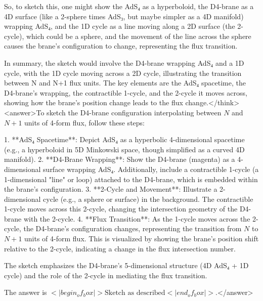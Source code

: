 So, to sketch this, one might show the AdS₄ as a hyperboloid, the D4-brane as a 4D surface (like a 2-sphere times AdS₃, but maybe simpler as a 4D manifold) wrapping AdS₄, and the 1D cycle as a line moving along a 2D surface (the 2-cycle), which could be a sphere, and the movement of the line across the sphere causes the brane's configuration to change, representing the flux transition.

In summary, the sketch would involve the D4-brane wrapping AdS₄ and a 1D cycle, with the 1D cycle moving across a 2D cycle, illustrating the transition between N and N+1 flux units. The key elements are the AdS₄ spacetime, the D4-brane's wrapping, the contractible 1-cycle, and the 2-cycle it moves across, showing how the brane's position change leads to the flux change.</think><answer>To sketch the D4-brane configuration interpolating between \( N \) and \( N+1 \) units of 4-form flux, follow these steps:  

1. **AdS₄ Spacetime**: Depict AdS₄ as a hyperbolic 4-dimensional spacetime (e.g., a hyperboloid in 5D Minkowski space, though simplified as a curved 4D manifold).  
2. **D4-Brane Wrapping**: Show the D4-brane (magenta) as a 4-dimensional surface wrapping AdS₄. Additionally, include a contractible 1-cycle (a 1-dimensional "line" or loop) attached to the D4-brane, which is embedded within the brane’s configuration.  
3. **2-Cycle and Movement**: Illustrate a 2-dimensional cycle (e.g., a sphere or surface) in the background. The contractible 1-cycle moves across this 2-cycle, changing the intersection geometry of the D4-brane with the 2-cycle.  
4. **Flux Transition**: As the 1-cycle moves across the 2-cycle, the D4-brane’s configuration changes, representing the transition from \( N \) to \( N+1 \) units of 4-form flux. This is visualized by showing the brane’s position shift relative to the 2-cycle, indicating a change in the flux intersection number.  

The sketch emphasizes the D4-brane’s 5-dimensional structure (4D AdS₄ + 1D cycle) and the role of the 2-cycle in mediating the flux transition.  

The answer is \(<|begin_of_box|>\text{Sketch as described}<|end_of_box|>\).</answer>